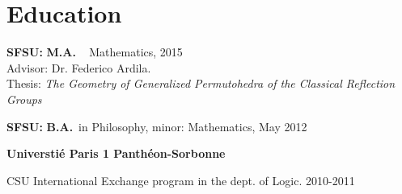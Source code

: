  \section{\sc Education} 
\begin{list1}
\item  {\bf SFSU:}  \textbf{M.A.} ~ Mathematics, 2015 \\
Advisor: Dr. Federico Ardila. \\
 Thesis: {\em The Geometry of Generalized Permutohedra of the Classical Reflection Groups} 


\item  {\bf SFSU:}  \textbf{B.A.}~in Philosophy, minor:    
Mathematics, May 2012 

\item {\bf Universti\'e Paris 1 Panth\'{e}on-Sorbonne}

CSU International Exchange program in the dept. of Logic. 2010-2011\\

%

\end{list1}